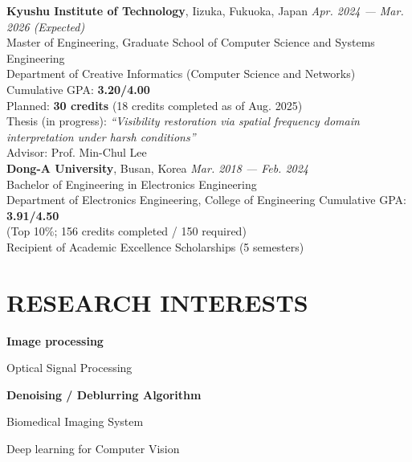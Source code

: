 \documentclass[a4paper,9pt]{extarticle}
\begin{document}


\textbf{Kyushu Institute of Technology}, Iizuka, Fukuoka, Japan \hfill \textit{Apr. 2024 — Mar. 2026 (Expected)} \\
Master of Engineering, Graduate School of Computer Science and Systems Engineering \\
Department of Creative Informatics (Computer Science and Networks) \hfill Cumulative GPA: \textbf{3.20/4.00} \\
Planned: \textbf{30 credits} (18 credits completed as of Aug. 2025) \\
Thesis (in progress): \textit{“Visibility restoration via spatial frequency domain interpretation under harsh conditions”} \\
Advisor: Prof. Min-Chul Lee \\

\noindent
\textbf{Dong-A University}, Busan, Korea \hfill \textit{Mar. 2018 — Feb. 2024} \\
Bachelor of Engineering in Electronics Engineering \\
Department of Electronics Engineering, College of Engineering \hfill Cumulative GPA: \textbf{3.91/4.50} \\
(Top 10\%; 156 credits completed / 150 required) \\
Recipient of Academic Excellence Scholarships (5 semesters) \\



\section*{RESEARCH INTERESTS}
\begin{description}
    \item \textbf{Image processing}
    \item Optical Signal Processing
    \item \textbf{Denoising / Deblurring Algorithm}
    \item Biomedical Imaging System
    \item Deep learning for Computer Vision \\
\end{description}
\end{document}
